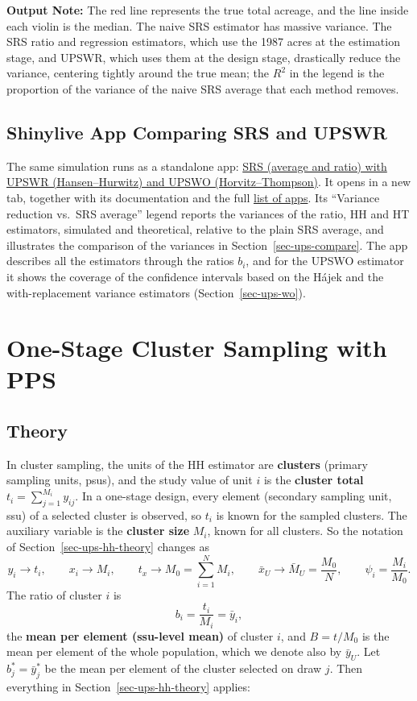 \documentclass[
  letterpaper,
  DIV=11,
  numbers=noendperiod]{scrreprt}
\renewcommand{\[}{\begin{equation}}
\renewcommand{\]}{\end{equation}}
\begin{document}
\textbf{Output Note:} The red line represents the true total acreage,
and the line inside each violin is the median. The naive SRS estimator
has massive variance. The SRS ratio and regression estimators, which use
the 1987 acres at the estimation stage, and UPSWR, which uses them at
the design stage, drastically reduce the variance, centering tightly
around the true mean; the \(R^2\) in the legend is the proportion of the
variance of the naive SRS average that each method removes.

\subsection{Shinylive App Comparing SRS and UPSWR}\label{sec-ups-app}

The same simulation runs as a standalone app:
\href{../shinylives_sampling/app-ups.html}{SRS (average and ratio) with
UPSWR (Hansen--Hurwitz) and UPSWO (Horvitz--Thompson)}. It opens in a
new tab, together with its documentation and the full
\href{../shinylives_sampling/index.html}{list of apps}. Its ``Variance
reduction vs.~SRS average'' legend reports the variances of the ratio,
HH and HT estimators, simulated and theoretical, relative to the plain
SRS average, and illustrates the comparison of the variances in
Section~\ref{sec-ups-compare}. The app describes all the estimators
through the ratios \(b_i\), and for the UPSWO estimator it shows the
coverage of the confidence intervals based on the Hájek and the
with-replacement variance estimators (Section~\ref{sec-ups-wo}).

\section{One-Stage Cluster Sampling with PPS}\label{sec-ups-cluster}

\subsection{Theory}\label{sec-ups-cluster-theory}

In cluster sampling, the units of the HH estimator are \textbf{clusters}
(primary sampling units, psus), and the study value of unit \(i\) is the
\textbf{cluster total} \(t_i=\sum_{j=1}^{M_i}y_{ij}\). In a one-stage
design, every element (secondary sampling unit, ssu) of a selected
cluster is observed, so \(t_i\) is known for the sampled clusters. The
auxiliary variable is the \textbf{cluster size} \(M_i\), known for all
clusters. So the notation of Section~\ref{sec-ups-hh-theory} changes as
\[
y_i \to t_i,\qquad x_i\to M_i,\qquad t_x\to M_0=\sum_{i=1}^N M_i,\qquad \bar{x}_U\to\bar{M}_U=\frac{M_0}{N},
\qquad \psi_i=\frac{M_i}{M_0}.
\] The ratio of cluster \(i\) is \[
b_i=\frac{t_i}{M_i}=\bar{y}_i ,
\] the \textbf{mean per element (ssu-level mean)} of cluster \(i\), and
\(B=t/M_0\) is the mean per element of the whole population, which we
denote also by \(\bar{y}_U\). Let \(b_j^*=\bar{y}_j^*\) be the mean per
element of the cluster selected on draw \(j\). Then everything in
Section~\ref{sec-ups-hh-theory} applies:
\end{document}
